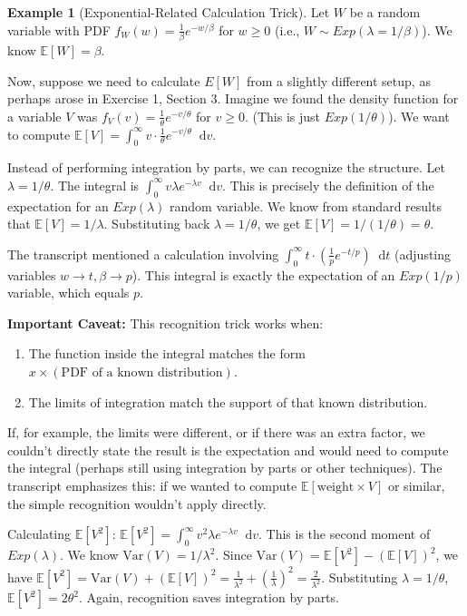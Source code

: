 \documentclass[11pt, letterpaper]{article}
\theoremstyle{plain} %
\theoremstyle{definition} %
\newtheorem{example}[theorem]{Example}
\theoremstyle{remark} %
\newcommand{\E}{\mathbb{E}}
\newcommand{\Var}{\mathrm{Var}}
\newcommand{\dee}{\mathop{}\!\mathrm{d}} %
\begin{document}
\begin{example}[Exponential-Related Calculation Trick] \label{ex:exp_trick}
Let $W$ be a random variable with PDF $f_W(w) = \frac{1}{\beta} e^{-w/\beta}$ for $w \ge 0$ (i.e., $W \sim Exp(\lambda=1/\beta)$). We know $\E[W] = \beta$.

Now, suppose we need to calculate $E[W]$ from a slightly different setup, as perhaps arose in Exercise 1, Section 3. Imagine we found the density function for a variable $V$ was $f_V(v) = \frac{1}{\theta} e^{-v/\theta}$ for $v \ge 0$. (This is just $Exp(1/\theta)$).
We want to compute $\E[V] = \int_0^\infty v \cdot \frac{1}{\theta} e^{-v/\theta} \dee v$.

Instead of performing integration by parts, we can recognize the structure.
Let $\lambda = 1/\theta$. The integral is $\int_0^\infty v \lambda e^{-\lambda v} \dee v$.
This is precisely the definition of the expectation for an $Exp(\lambda)$ random variable. We know from standard results that $\E[V] = 1/\lambda$.
Substituting back $\lambda = 1/\theta$, we get $\E[V] = 1/(1/\theta) = \theta$.

The transcript mentioned a calculation involving $\int_0^\infty t \cdot (\frac{1}{p} e^{-t/p}) \dee t$ (adjusting variables $w \to t, \beta \to p$). This integral is exactly the expectation of an $Exp(1/p)$ variable, which equals $p$.

\textbf{Important Caveat:} %
This recognition trick works when:
\begin{enumerate} %
    \item The function inside the integral matches the form $x \times (\text{PDF of a known distribution})$.
    \item The limits of integration match the support of that known distribution.
\end{enumerate} %

If, for example, the limits were different, or if there was an extra factor, we couldn't directly state the result is the expectation and would need to compute the integral (perhaps still using integration by parts or other techniques). The transcript emphasizes this: if we wanted to compute $\E[\text{weight} \times V]$ or similar, the simple recognition wouldn't apply directly.

Calculating $\E[V^2]$: $\E[V^2] = \int_0^\infty v^2 \lambda e^{-\lambda v} \dee v$. This is the second moment of $Exp(\lambda)$. We know $\Var(V) = 1/\lambda^2$. Since $\Var(V) = \E[V^2] - (\E[V])^2$, we have $\E[V^2] = \Var(V) + (\E[V])^2 = \frac{1}{\lambda^2} + (\frac{1}{\lambda})^2 = \frac{2}{\lambda^2}$. Substituting $\lambda=1/\theta$, $\E[V^2] = 2\theta^2$. Again, recognition saves integration by parts.
\end{example}
\end{document}
